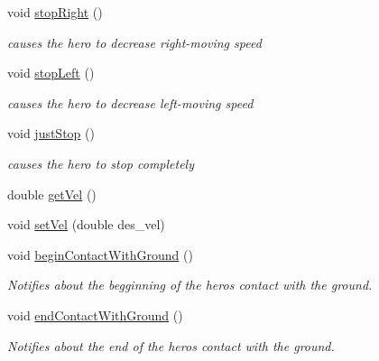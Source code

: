 \begin{DoxyCompactItemize}
void \hyperlink{class_player_afebb6b7ca7210e7b1aa2c9ee4ff75b0e}{stop\+Right} ()
\begin{DoxyCompactList}\small\item\em causes the hero to decrease right-\/moving speed \end{DoxyCompactList}\item 
\mbox{\label{class_player_aa150f941486096bb63cc67eabec9046c}} 
void \hyperlink{class_player_aa150f941486096bb63cc67eabec9046c}{stop\+Left} ()
\begin{DoxyCompactList}\small\item\em causes the hero to decrease left-\/moving speed \end{DoxyCompactList}\item 
\mbox{\label{class_player_aaefa871e86a0ae126f3654b1078e0ffa}} 
void \hyperlink{class_player_aaefa871e86a0ae126f3654b1078e0ffa}{just\+Stop} ()
\begin{DoxyCompactList}\small\item\em causes the hero to stop completely \end{DoxyCompactList}\item 
double \hyperlink{class_player_afbabae83ae2b21caf794efa91e26c37d}{get\+Vel} ()
\item 
void \hyperlink{class_player_ade0e4463e66975e549986ce55cac9467}{set\+Vel} (double des\+\_\+vel)
\item 
\mbox{\label{class_player_a35883d3f8b0087209e9f5989fd4142db}} 
void \hyperlink{class_player_a35883d3f8b0087209e9f5989fd4142db}{begin\+Contact\+With\+Ground} ()
\begin{DoxyCompactList}\small\item\em Notifies about the begginning of the hero\textquotesingle{}s contact with the ground. \end{DoxyCompactList}\item 
\mbox{\label{class_player_aadd86e4d822fb07db4a37856506d16e7}} 
void \hyperlink{class_player_aadd86e4d822fb07db4a37856506d16e7}{end\+Contact\+With\+Ground} ()
\begin{DoxyCompactList}\small\item\em Notifies about the end of the hero\textquotesingle{}s contact with the ground. \end{DoxyCompactList}\item 

\end{DoxyCompactItemize}
